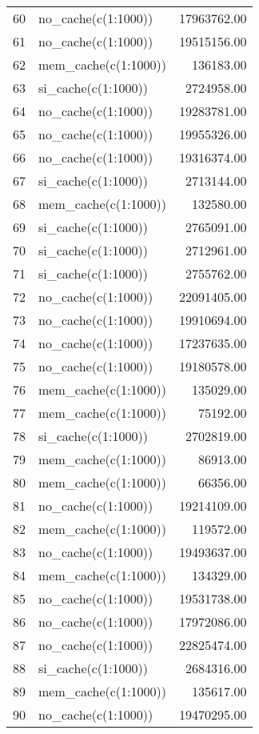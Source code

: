 \begin{table}[ht]
\begin{tabular}{rlr}
  60 & no\_cache(c(1:1000)) & 17963762.00 \\ 
  61 & no\_cache(c(1:1000)) & 19515156.00 \\ 
  62 & mem\_cache(c(1:1000)) & 136183.00 \\ 
  63 & si\_cache(c(1:1000)) & 2724958.00 \\ 
  64 & no\_cache(c(1:1000)) & 19283781.00 \\ 
  65 & no\_cache(c(1:1000)) & 19955326.00 \\ 
  66 & no\_cache(c(1:1000)) & 19316374.00 \\ 
  67 & si\_cache(c(1:1000)) & 2713144.00 \\ 
  68 & mem\_cache(c(1:1000)) & 132580.00 \\ 
  69 & si\_cache(c(1:1000)) & 2765091.00 \\ 
  70 & si\_cache(c(1:1000)) & 2712961.00 \\ 
  71 & si\_cache(c(1:1000)) & 2755762.00 \\ 
  72 & no\_cache(c(1:1000)) & 22091405.00 \\ 
  73 & no\_cache(c(1:1000)) & 19910694.00 \\ 
  74 & no\_cache(c(1:1000)) & 17237635.00 \\ 
  75 & no\_cache(c(1:1000)) & 19180578.00 \\ 
  76 & mem\_cache(c(1:1000)) & 135029.00 \\ 
  77 & mem\_cache(c(1:1000)) & 75192.00 \\ 
  78 & si\_cache(c(1:1000)) & 2702819.00 \\ 
  79 & mem\_cache(c(1:1000)) & 86913.00 \\ 
  80 & mem\_cache(c(1:1000)) & 66356.00 \\ 
  81 & no\_cache(c(1:1000)) & 19214109.00 \\ 
  82 & mem\_cache(c(1:1000)) & 119572.00 \\ 
  83 & no\_cache(c(1:1000)) & 19493637.00 \\ 
  84 & mem\_cache(c(1:1000)) & 134329.00 \\ 
  85 & no\_cache(c(1:1000)) & 19531738.00 \\ 
  86 & no\_cache(c(1:1000)) & 17972086.00 \\ 
  87 & no\_cache(c(1:1000)) & 22825474.00 \\ 
  88 & si\_cache(c(1:1000)) & 2684316.00 \\ 
  89 & mem\_cache(c(1:1000)) & 135617.00 \\ 
  90 & no\_cache(c(1:1000)) & 19470295.00 \\ 

\end{tabular}
\end{table}
